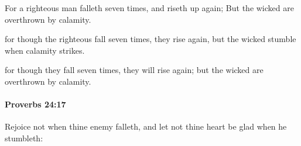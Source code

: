 			\begin{versebox}
					\item[BHS] 
					\item[ASV] For a righteous man falleth seven times, and riseth up again; But the wicked are overthrown by calamity.
					\item[NIV] for though the righteous fall seven times, they rise again, but the wicked stumble when calamity strikes.
					\item[NRSV] for though they fall seven times, they will rise again; but the wicked are overthrown by calamity.
			\end{versebox}

		\paragraph{Proverbs 24:17} %
			\label{PROVERBS-24-17}

			Rejoice not when thine enemy falleth, and let not thine heart be glad when he stumbleth:

